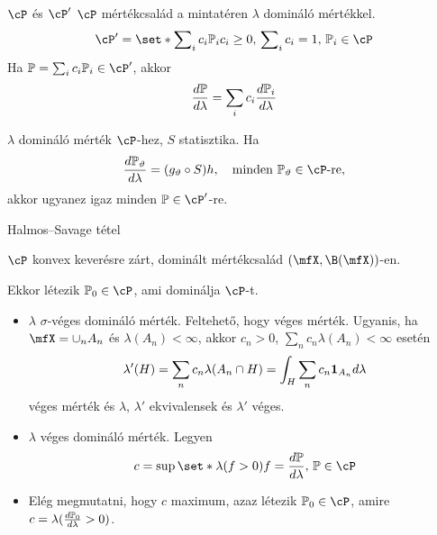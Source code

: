 \documentclass[aspectratio=169,notheorems,9pt,\option]{beamer}
\begin{document}
\begin{frame}{$\cP$ és $\cP'$}
$\cP$ %
mértékcsalád a mintatéren $\lambda$ domináló mértékkel.
\begin{displaymath}
  \cP'=\set*{\sum\nolimits_i c_i\P[i]}{c_i\geq0,\,\sum\nolimits_i c_i=1,\,\P[i]\in\cP}  
\end{displaymath}
Ha $\P=\sum_i c_i\P[i]\in\cP'$, akkor
\begin{displaymath}
  \frac{d\P}{d\lambda} = \sum_{i} c_i\frac{d\P[i]}{d\lambda}
\end{displaymath}

\begin{proposition}
  $\lambda $ domináló mérték $\cP$-hez, $S$ statisztika. Ha
  \begin{displaymath}
    \frac{d\P[\theta]}{d\lambda}=(g_{\theta}\circ S)h,\quad \text{minden $\P[\theta]\in\cP$-re},
  \end{displaymath} 
  akkor ugyanez igaz minden $\P\in\cP'$-re.
\end{proposition}
\end{frame}

\begin{frame}{Halmos--Savage tétel}
\begin{theorem}
  $\cP$ konvex keverésre zárt, dominált mértékcsalád $(\mfX,\B(\mfX))$-en. 
  
  Ekkor létezik $\P[0]\in\cP$, ami dominálja $\cP$-t.
\end{theorem}
\begin{itemize}
  \item $\lambda$ $\sigma$-véges domináló mérték. Feltehető, hogy véges mérték. Ugyanis,
   ha $\mfX=\cup_n A_n$ és $\lambda(A_n)<\infty$, akkor 
   $c_n>0$, $\sum_n c_n\lambda(A_n)<\infty$ esetén
   \begin{displaymath}
     \lambda'(H)=\sum_n c_n \lambda(A_n\cap H)=\int_H \sum_n c_n\I[A_n] d\lambda
   \end{displaymath}
   véges mérték és $\lambda$, $\lambda'$ ekvivalensek és $\lambda'$ véges.
   \item $\lambda$ véges domináló mérték. Legyen
   \begin{displaymath}
    c=\sup\set*{\lambda(f>0)}{f=\frac{d\P}{d\lambda},\,\P\in\cP}
   \end{displaymath}
   \item Elég megmutatni, hogy $c$ maximum, 
   azaz létezik $\P[0]\in\cP$, amire $c=\lambda(\frac{d\P[0]}{d\lambda}>0)$.     
\end{itemize}

\end{frame}
\end{document}
